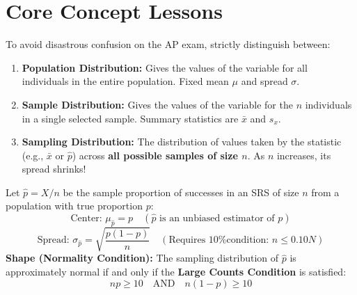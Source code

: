 \section{Core Concept Lessons}

\begin{lessonbox}
To avoid disastrous confusion on the AP exam, strictly distinguish between:
\begin{enumerate}[leftmargin=1.5em]
  \item \textbf{Population Distribution:} Gives the values of the variable for all individuals in the entire population. Fixed mean $\mu$ and spread $\sigma$.
  \item \textbf{Sample Distribution:} Gives the values of the variable for the $n$ individuals in a single selected sample. Summary statistics are $\bar{x}$ and $s_x$.
  \item \textbf{Sampling Distribution:} The distribution of values taken by the statistic (e.g., $\bar{x}$ or $\hat{p}$) across \textbf{all possible samples of size $n$}. As $n$ increases, its spread shrinks!
\end{enumerate}
\end{lessonbox}

\begin{lessonbox}
Let $\hat{p} = X/n$ be the sample proportion of successes in an SRS of size $n$ from a population with true proportion $p$:
\begin{equation}
  \text{Center: } \mu_{\hat{p}} = p \quad (\hat{p} \text{ is an unbiased estimator of } p)
\end{equation}
\begin{equation}
  \text{Spread: } \sigma_{\hat{p}} = \sqrt{\frac{p(1-p)}{n}} \quad (\text{Requires 10\% condition: } n \le 0.10N)
\end{equation}
\textbf{Shape (Normality Condition):}
The sampling distribution of $\hat{p}$ is approximately normal if and only if the \textbf{Large Counts Condition} is satisfied:
\begin{equation}
  np \ge 10 \quad \text{AND} \quad n(1-p) \ge 10
\end{equation}
\end{lessonbox}

